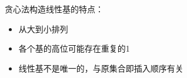 贪心法构造线性基的特点：
\begin{itemize}
    \item 从大到小排列
    \item 各个基的高位可能存在重复的1
    \item 线性基不是唯一的，与原集合即插入顺序有关
\end{itemize}